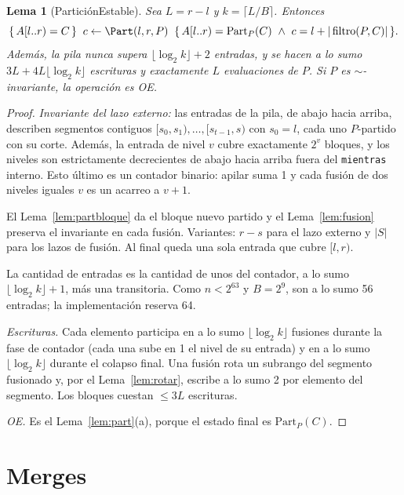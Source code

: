 \documentclass[10pt,a4paper]{article}
\theoremstyle{plain}
\newtheorem{lema}[teorema]{Lema}
\theoremstyle{definition}
\theoremstyle{remark}
\newcommand{\eqv}{\sim}
\newcommand{\Bsz}{B}
\newcommand{\filt}{\operatorname{filtro}}
\newcommand{\hoare}[3]{\{\,#1\,\}\;\;#2\;\;\{\,#3\,\}}
\begin{document}
\begin{lema}[ParticiónEstable]\label{lem:partest}
Sea $L=r-l$ y $k=\lceil L/\Bsz\rceil$. Entonces
\[
\hoare{A[l..r)=C}{c\gets\Part(l,r,P)}{A[l..r)=\mathrm{Part}_P(C)\ \wedge\ c=l+|\filt(P,C)|}.
\]
Además, la pila nunca supera $\lfloor\log_2 k\rfloor+2$ entradas, y se hacen a lo sumo
$3L+4L\lfloor\log_2 k\rfloor$ escrituras y exactamente $L$ evaluaciones de $P$. Si $P$
es $\eqv$-invariante, la operación es OE.
\end{lema}
\begin{proof}
\emph{Invariante del lazo externo:} las entradas de la pila, de abajo hacia arriba,
describen segmentos contiguos $[s_0,s_1),\dots,[s_{t-1},s)$ con $s_0=l$, cada uno
$P$-partido con su corte. Además, la entrada de nivel $v$ cubre exactamente $2^v$
bloques, y los niveles son estrictamente decrecientes de abajo hacia arriba fuera del
\texttt{mientras} interno. Esto último es un contador binario: apilar suma 1 y cada
fusión de dos niveles iguales $v$ es un acarreo a $v+1$.

El Lema~\ref{lem:partbloque} da el bloque nuevo partido y el Lema~\ref{lem:fusion}
preserva el invariante en cada fusión. Variantes: $r-s$ para el lazo externo y $|S|$
para los lazos de fusión. Al final queda una sola entrada que cubre $[l,r)$.

La cantidad de entradas es la cantidad de unos del contador, a lo sumo
$\lfloor\log_2 k\rfloor+1$, más una transitoria. Como $n<2^{63}$ y $\Bsz=2^9$, son a
lo sumo 56 entradas; la implementación reserva 64.

\emph{Escrituras.} Cada elemento participa en a lo sumo $\lfloor\log_2 k\rfloor$
fusiones durante la fase de contador (cada una sube en 1 el nivel de su entrada) y en
a lo sumo $\lfloor\log_2 k\rfloor$ durante el colapso final. Una fusión rota un
subrango del segmento fusionado y, por el Lema~\ref{lem:rotar}, escribe a lo sumo
2 por elemento del segmento. Los bloques cuestan $\le 3L$ escrituras.

\emph{OE.} Es el Lema~\ref{lem:part}(a), porque el estado final es
$\mathrm{Part}_P(C)$.
\end{proof}

\section{Merges}
\end{document}
